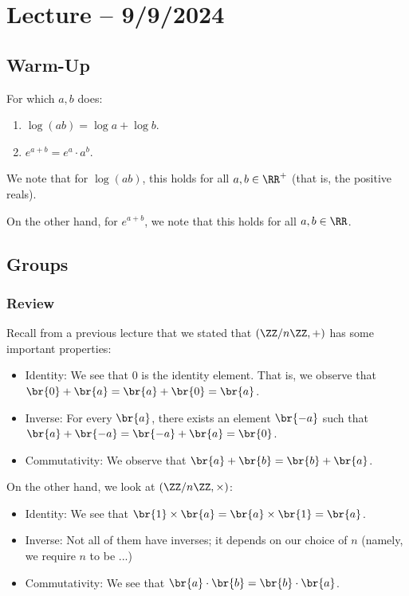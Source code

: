 \documentclass[openany]{book}
\begin{document}
\section{Lecture -- 9/9/2024}
\subsection{Warm-Up}
\begin{hw}
	For which $a,b$ does:
	\begin{enumerate}
		\item $\log(ab) = \log a + \log b$.
		\item $e^{a+b} = e^{a} \cdot a^{b}$.
	\end{enumerate}
\end{hw}
\begin{solution}
	We note that for $\log(ab)$, this holds for all $a, b \in \RR^{+}$ (that is, the positive reals).
	
	On the other hand, for $e^{a+b}$, we note that this holds for all $a,b \in \RR$.
\end{solution}

\subsection{Groups}
\subsubsection{Review}
Recall from a previous lecture that we stated that $(\ZZ/n\ZZ, +)$ has some important properties:
\begin{itemize}
	\item Identity: We see that $0$ is the identity element. That is, we observe that $\br{0} + \br{a} = \br{a} + \br{0} = \br{a}$.
	\item Inverse: For every $\br{a}$, there exists an element $\br{-a}$ such that $\br{a} + \br{-a} = \br{-a} + \br{a} = \br{0}$.
	\item Commutativity: We observe that $\br{a} + \br{b} = \br{b} + \br{a}$.
\end{itemize}

On the other hand, we look at $(\ZZ/n\ZZ, \times)$:
\begin{itemize}
	\item Identity: We see that $\br{1} \times \br{a} = \br{a} \times \br{1} = \br{a}$.
	\item Inverse: Not all of them have inverses; it depends on our choice of $n$ (namely, we require $n$ to be ...)
	\item Commutativity: We see that $\br{a} \cdot \br{b} = \br{b} \cdot \br{a}$.
\end{itemize}
\end{document}
